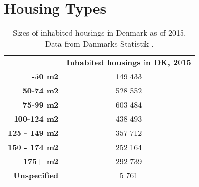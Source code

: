\chapter{Housing Types}
\label{appendix:housing-types}

\begin{table}[ht]
\centering
\caption{Sizes of inhabited housings in Denmark as of 2015. Data from Danmarks Statistik \cite{danmarksstatistik:housing-types}.}
\label{appendix:housing-types:table}
\begin{tabular}{rc}
\multicolumn{1}{l}{}  & \textbf{Inhabited housings in DK, 2015} \\
\textbf{-50 m2}       & 149 433                                \\
\textbf{50-74 m2}     & 528 552                                \\
\textbf{75-99 m2}     & 603 484                                \\
\textbf{100-124 m2}   & 438 493                                \\
\textbf{125 - 149 m2} & 357 712                                \\
\textbf{150 - 174 m2} & 252 164                                \\
\textbf{175+ m2}      & 292 739                                \\
\textbf{Unspecified}  & 5 761                                 
\end{tabular}
\end{table}

